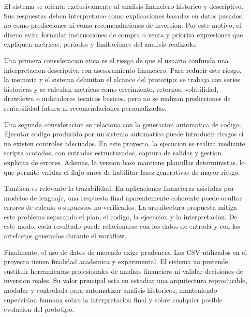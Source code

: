 El sistema se orienta exclusivamente al analisis financiero historico y descriptivo. Sus respuestas deben interpretarse como explicaciones basadas en datos pasados, no como predicciones ni como recomendaciones de inversion. Por este motivo, el diseno evita formular instrucciones de compra o venta y prioriza expresiones que expliquen metricas, periodos y limitaciones del analisis realizado.

Una primera consideracion etica es el riesgo de que el usuario confunda una interpretacion descriptiva con asesoramiento financiero. Para reducir este riesgo, la memoria y el sistema delimitan el alcance del prototipo: se trabaja con series historicas y se calculan metricas como crecimiento, retornos, volatilidad, drawdown o indicadores tecnicos basicos, pero no se realizan predicciones de rentabilidad futura ni recomendaciones personalizadas.

Una segunda consideracion se relaciona con la generacion automatica de codigo. Ejecutar codigo producido por un sistema automatico puede introducir riesgos si no existen controles adecuados. En este proyecto, la ejecucion se realiza mediante scripts acotados, con entradas estructuradas, captura de salidas y gestion explicita de errores. Ademas, la version base mantiene plantillas deterministas, lo que permite validar el flujo antes de habilitar fases generativas de mayor riesgo.

Tambien es relevante la trazabilidad. En aplicaciones financieras asistidas por modelos de lenguaje, una respuesta final aparentemente coherente puede ocultar errores de calculo o supuestos no verificados. La arquitectura propuesta mitiga este problema separando el plan, el codigo, la ejecucion y la interpretacion. De este modo, cada resultado puede relacionarse con los datos de entrada y con los artefactos generados durante el workflow.

Finalmente, el uso de datos de mercado exige prudencia. Los CSV utilizados en el proyecto tienen finalidad academica y experimental. El sistema no pretende sustituir herramientas profesionales de analisis financiero ni validar decisiones de inversion reales. Su valor principal esta en estudiar una arquitectura reproducible, modular y controlada para automatizar analisis historicos, manteniendo supervision humana sobre la interpretacion final y sobre cualquier posible evolucion del prototipo.
